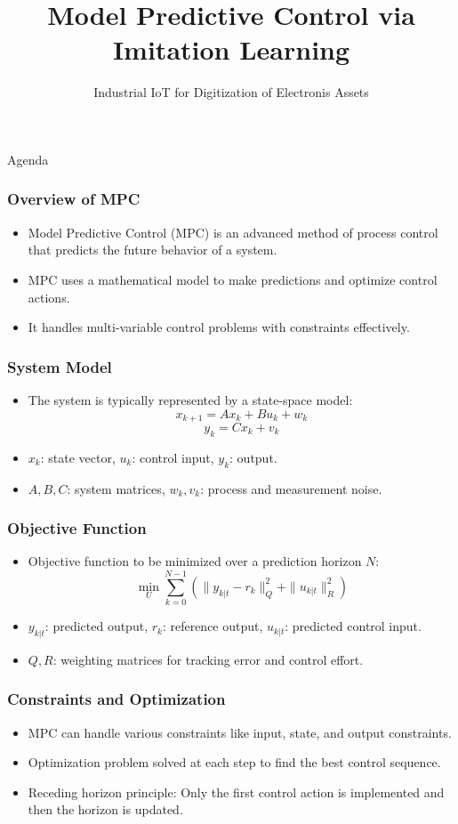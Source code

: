\documentclass[aspectratio=169,hyperref={pdfpagelabels=false}]{beamer}
\subtitle{\normalsize{Industrial IoT for Digitization of Electronis Assets}}
\title{Model Predictive Control via Imitation Learning}
\begin{document}
\inserttitlepage

\begin{frame}{Agenda}
  \tableofcontents
\end{frame}

\begin{frame}
  \frametitle{Overview of MPC}
  \begin{itemize}
      \item Model Predictive Control (MPC) is an advanced method of process control that predicts the future behavior of a system.
      \item MPC uses a mathematical model to make predictions and optimize control actions.
      \item It handles multi-variable control problems with constraints effectively.
  \end{itemize}
  \end{frame}
  
  \begin{frame}
  \frametitle{System Model}
  \begin{itemize}
      \item The system is typically represented by a state-space model:
      \[ x_{k+1} = Ax_k + Bu_k + w_k \]
      \[ y_k = Cx_k + v_k \]
      \item \( x_k \): state vector, \( u_k \): control input, \( y_k \): output.
      \item \( A, B, C \): system matrices, \( w_k, v_k \): process and measurement noise.
  \end{itemize}
  \end{frame}
  
  \begin{frame}
  \frametitle{Objective Function}
  \begin{itemize}
      \item Objective function to be minimized over a prediction horizon \( N \):
      \[ \min_{U} \sum_{k=0}^{N-1} \left( \|y_{k|t} - r_{k}\|^2_Q + \|u_{k|t}\|^2_R \right) \]
      \item \( y_{k|t} \): predicted output, \( r_{k} \): reference output, \( u_{k|t} \): predicted control input.
      \item \( Q, R \): weighting matrices for tracking error and control effort.
  \end{itemize}
  \end{frame}
  
  \begin{frame}
  \frametitle{Constraints and Optimization}
  \begin{itemize}
      \item MPC can handle various constraints like input, state, and output constraints.
      \item Optimization problem solved at each step to find the best control sequence.
      \item Receding horizon principle: Only the first control action is implemented and then the horizon is updated.
  \end{itemize}
  \end{frame}
  
\end{document}
